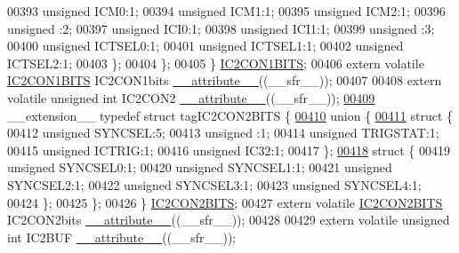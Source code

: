 \begin{DoxyCode}
00393       \textcolor{keywordtype}{unsigned} ICM0:1;
00394       \textcolor{keywordtype}{unsigned} ICM1:1;
00395       \textcolor{keywordtype}{unsigned} ICM2:1;
00396       \textcolor{keywordtype}{unsigned} :2;
00397       \textcolor{keywordtype}{unsigned} ICI0:1;
00398       \textcolor{keywordtype}{unsigned} ICI1:1;
00399       \textcolor{keywordtype}{unsigned} :3;
00400       \textcolor{keywordtype}{unsigned} ICTSEL0:1;
00401       \textcolor{keywordtype}{unsigned} ICTSEL1:1;
00402       \textcolor{keywordtype}{unsigned} ICTSEL2:1;
00403     \};
00404   \};
00405 \} \hyperlink{a00014_d7/d5e/a00467}{IC2CON1BITS};
00406 \textcolor{keyword}{extern} \textcolor{keyword}{volatile} \hyperlink{a00014_d7/d5e/a00467}{IC2CON1BITS} IC2CON1bits \hyperlink{a00015_a493c46f03454991ccc5aa7a6e1dfb2a7}{\_\_attribute\_\_}((\_\_sfr\_\_));
00407 
00408 \textcolor{keyword}{extern} \textcolor{keyword}{volatile} \textcolor{keywordtype}{unsigned} \textcolor{keywordtype}{int}  IC2CON2 \hyperlink{a00015_a493c46f03454991ccc5aa7a6e1dfb2a7}{\_\_attribute\_\_}((\_\_sfr\_\_));
\hypertarget{a00015_source_l00409}{}\hyperlink{a00014}{00409} \_\_extension\_\_ \textcolor{keyword}{typedef} \textcolor{keyword}{struct }tagIC2CON2BITS \{
\hypertarget{a00015_source_l00410}{}\hyperlink{a00015}{00410}   \textcolor{keyword}{union }\{
\hypertarget{a00015_source_l00411}{}\hyperlink{a00015}{00411}     \textcolor{keyword}{struct }\{
00412       \textcolor{keywordtype}{unsigned} SYNCSEL:5;
00413       \textcolor{keywordtype}{unsigned} :1;
00414       \textcolor{keywordtype}{unsigned} TRIGSTAT:1;
00415       \textcolor{keywordtype}{unsigned} ICTRIG:1;
00416       \textcolor{keywordtype}{unsigned} IC32:1;
00417     \};
\hypertarget{a00015_source_l00418}{}\hyperlink{a00015}{00418}     \textcolor{keyword}{struct }\{
00419       \textcolor{keywordtype}{unsigned} SYNCSEL0:1;
00420       \textcolor{keywordtype}{unsigned} SYNCSEL1:1;
00421       \textcolor{keywordtype}{unsigned} SYNCSEL2:1;
00422       \textcolor{keywordtype}{unsigned} SYNCSEL3:1;
00423       \textcolor{keywordtype}{unsigned} SYNCSEL4:1;
00424     \};
00425   \};
00426 \} \hyperlink{a00014_d0/d29/a00470}{IC2CON2BITS};
00427 \textcolor{keyword}{extern} \textcolor{keyword}{volatile} \hyperlink{a00014_d0/d29/a00470}{IC2CON2BITS} IC2CON2bits \hyperlink{a00015_a493c46f03454991ccc5aa7a6e1dfb2a7}{\_\_attribute\_\_}((\_\_sfr\_\_));
00428 
00429 \textcolor{keyword}{extern} \textcolor{keyword}{volatile} \textcolor{keywordtype}{unsigned} \textcolor{keywordtype}{int}  IC2BUF \hyperlink{a00015_a493c46f03454991ccc5aa7a6e1dfb2a7}{\_\_attribute\_\_}((\_\_sfr\_\_));

\end{DoxyCode}
